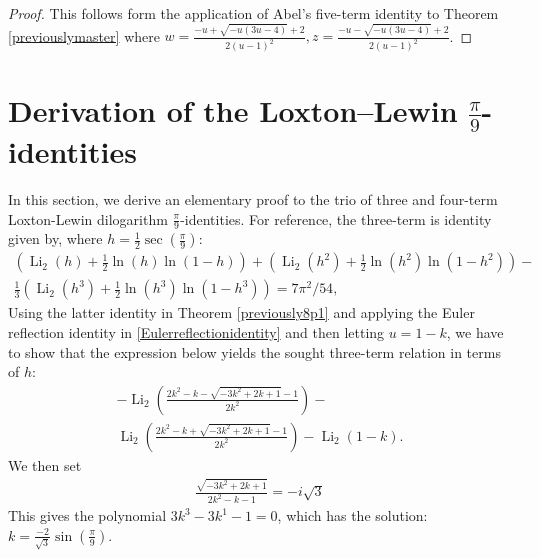 \documentclass[12pt]{article}
\begin{document}
\begin{proof}
 This follows form the application of Abel's five-term identity to Theorem \ref{previouslymaster} 
 where $w = \frac{-u + \sqrt{-u (3 u - 4)} + 2}{2 (u - 1)^2}, z = \frac{-u - \sqrt{-u (3 u - 4)} + 2}{2 (u - 1)^2}$. 
\end{proof}

\section{Derivation of the Loxton--Lewin $\frac{\pi}{9}$-identities}
 In this section, we derive an elementary proof to the trio of three and four-term Loxton-Lewin dilogarithm $\frac{\pi}{9}$-identities. For reference, the three-term is identity given by, where $h = \frac{1}{2} \sec\left(\frac{\pi}{9}\right)$:
\begin{equation*}
\begin{aligned}
 \left( \operatorname{Li}_2(h) + \frac{1}{2} \ln(h) \ln(1 - h) \right) 
 + \left( \operatorname{Li}_2(h^2) + \frac{1}{2} \ln(h^2) \ln(1 - h^2) \right) - \\ 
 \frac{1}{3} \left( \operatorname{Li}_2(h^3) + \frac{1}{2} \ln(h^3) \ln(1 - h^3) \right)=7\pi^2/54, 
\end{aligned}
\end{equation*}
 Using the latter identity in Theorem \ref{previously8p1} and applying the Euler reflection identity in \eqref{Eulerreflectionidentity} 
 and then letting $u=1-k$, we have to show that the expression below yields the sought three-term relation in terms of $h$: 
\begin{multline*}
 - \operatorname{Li}_2\left(\frac{2 k^2 - k - \sqrt{-3 k^2 + 2 k + 1} - 1}{2 k^2}\right) - \\ 
 \operatorname{Li}_2\left(\frac{2 k^2 - k + \sqrt{-3 k^2 + 2 k + 1} - 1}{2 k^2}\right) 
 - \operatorname{Li}_2(1-k). 
\end{multline*}
 We then set 
\begin{equation*}
\begin{aligned}
\frac{\sqrt{-3 k^2 + 2 k + 1}}{2 k^2 - k - 1} = -i \sqrt{3}
\end{aligned}
\end{equation*}
 This gives the polynomial $3 k^3 - 3 k^1 - 1 =0$, which has the solution: $k=\frac{-2}{\sqrt{3}} \sin\left(\frac{\pi}{9}\right)$. 
\end{document}
